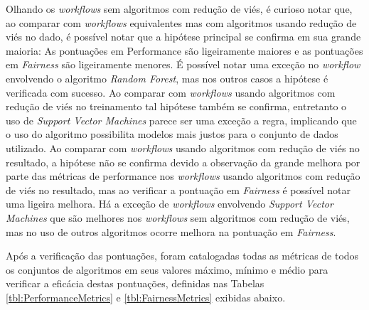 \documentclass[portugues]{ic-tese}
\begin{document}
Olhando os \textit{workflows} sem algoritmos com redução de viés, é curioso notar que, ao comparar com \textit{workflows} equivalentes mas com algoritmos usando redução de viés no dado, é possível notar que a hipótese principal se confirma em sua grande maioria: As pontuações em Performance são ligeiramente maiores e as pontuações em \textit{Fairness} são ligeiramente menores. É possível notar uma exceção no \textit{workflow} envolvendo o algoritmo \textit{Random Forest}, mas nos outros casos a hipótese é verificada com sucesso. Ao comparar com \textit{workflows} usando algoritmos com redução de viés no treinamento tal hipótese também se confirma, entretanto o uso de \textit{Support Vector Machines} parece ser uma exceção a regra, implicando que o uso do algoritmo possibilita modelos mais justos para o conjunto de dados utilizado. Ao comparar com \textit{workflows} usando algoritmos com redução de viés no resultado, a hipótese não se confirma devido a observação da grande melhora por parte das métricas de performance nos \textit{workflows} usando algoritmos com redução de viés no resultado, mas ao verificar a pontuação em \textit{Fairness} é possível notar uma ligeira melhora. Há a exceção de \textit{workflows} envolvendo \textit{Support Vector Machines} que são melhores nos \textit{workflows} sem algoritmos com redução de viés, mas no uso de outros algoritmos ocorre melhora na pontuação em \textit{Fairness}.

Após a verificação das pontuações, foram catalogadas todas as métricas de todos os conjuntos de algoritmos em seus valores máximo, mínimo e médio para verificar a eficácia destas pontuações, definidas nas Tabelas \ref{tbl:PerformanceMetrics} e \ref{tbl:FairnessMetrics} exibidas abaixo.
\end{document}
